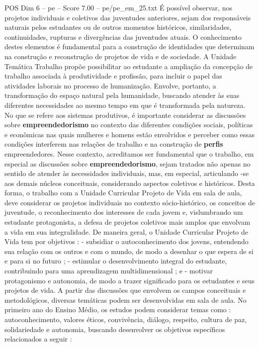 \begin{textsample}{POS Dim 6 – pe – Score 7.00 – pe/pe\_em\_25.txt}
É possível observar, nos projetos individuais e coletivos das juventudes anteriores, sejam dos responsáveis naturais pelos estudantes ou de outros momentos históricos, similaridades, continuidades, rupturas e divergências das juventudes atuais.
O conhecimento destes elementos é fundamental para a construção de identidades que determinam na construção e reconstrução de projetos de vida e de sociedade.
A Unidade Temática Trabalho propõe possibilitar ao estudante a ampliação da concepção de trabalho associada à produtividade e profissão, para incluir o papel das atividades laborais no processo de humanização.
Envolve, portanto, a transformação do espaço natural pela humanidade, buscando atender às suas diferentes necessidades ao mesmo tempo em que é transformada pela natureza.
No que se refere aos sistemas produtivos, é importante considerar as discussões sobre \textbf{empreendedorismo} no contexto das diferentes condições sociais, políticas e econômicas nas quais mulheres e homens estão envolvidos e perceber como essas condições interferem nas relações de trabalho e na construção de \textbf{perfis} empreendedores.
Nesse contexto, acreditamos ser fundamental que o trabalho, em especial as discussões sobre \textbf{empreendedorismo}, sejam tratados não apenas no sentido de atender às necessidades individuais, mas, em especial, articulando -se aos demais núcleos conceituais, considerando aspectos coletivos e históricos.
Desta forma, o trabalho com a Unidade Curricular Projeto de Vida em sala de aula, deve considerar os projetos individuais no contexto sócio-histórico, os conceitos de juventude, o reconhecimento dos interesses de cada jovem e, vislumbrando um estudante protagonista, a defesa de projetos coletivos mais amplos que envolvam a vida em sua integralidade.
De maneira geral, o Unidade Curricular Projeto de Vida tem por objetivos : - subsidiar o autoconhecimento dos jovens, entendendo sua relação com os outros e com o mundo, de modo a desenhar o que espera de si e para si no futuro ; - estimular o desenvolvimento integral do estudante, contribuindo para uma aprendizagem multidimensional ; e - motivar protagonismo e autonomia, de modo a trazer significado para os estudantes e seus projetos de vida.
A partir das discussões que envolvem os campos conceituais e metodológicos, diversas temáticas podem ser desenvolvidas em sala de aula.
No primeiro ano do Ensino Médio, os estudos podem considerar temas como : autoconhecimento, valores éticos, convivência, diálogo, respeito, cultura de paz, solidariedade e autonomia, buscando desenvolver os objetivos específicos relacionados a seguir :

\end{textsample}

